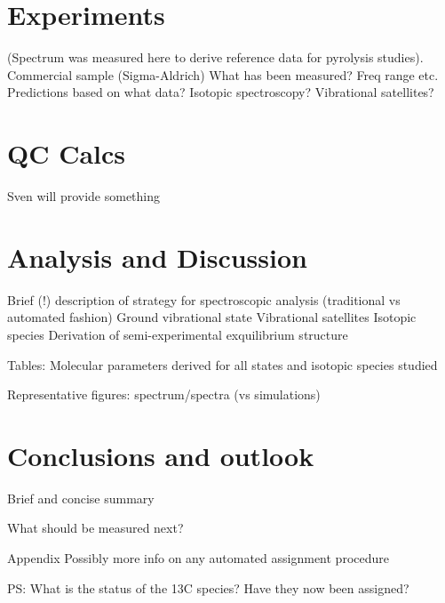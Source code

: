 \documentclass[a4paper]{article}
\begin{document}
\section{Experiments}

(Spectrum was measured here to derive reference data for pyrolysis studies).
Commercial sample (Sigma-Aldrich)
What has been measured? Freq range etc.
Predictions based on what data?
Isotopic spectroscopy? Vibrational satellites?

\section{QC Calcs}

Sven will provide something

\section{Analysis and Discussion}

Brief (!) description of strategy for spectroscopic analysis (traditional vs automated fashion)
Ground vibrational state
Vibrational satellites
Isotopic species
Derivation of semi-experimental exquilibrium structure

Tables: Molecular parameters derived for all states and isotopic species studied

Representative figures: spectrum/spectra (vs simulations)

\section{Conclusions and outlook}

Brief and concise summary

What should be measured next?

Appendix
Possibly more info on any automated assignment procedure

PS: What is the status of the 13C species? Have they now been assigned?








\end{document}
